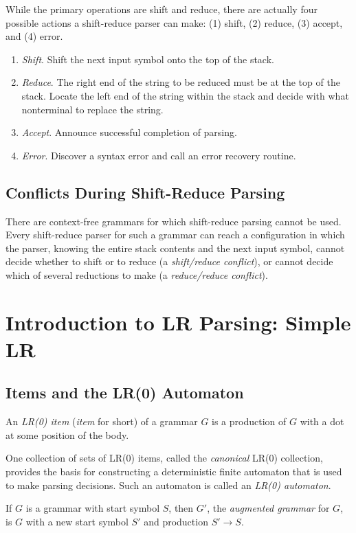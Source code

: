 \documentclass[12pt,a4paper,twoside,openany]{book}
\begin{document}
While the primary operations are shift and reduce, there are actually four possible actions a shift-reduce parser can make: (1) shift, (2) reduce, (3) accept, and (4) error.
\begin{enumerate}
    \item \textit{Shift}. Shift the next input symbol onto the top of the stack.
    \item \textit{Reduce}. The right end of the string to be reduced must be at the top of the stack. Locate the left end of the string within the stack and decide with what nonterminal to replace the string.
    \item \textit{Accept}. Announce successful completion of parsing.
    \item \textit{Error}. Discover a syntax error and call an error recovery routine.
\end{enumerate}

\subsection{Conflicts During Shift-Reduce Parsing}

There are context-free grammars for which shift-reduce parsing cannot be used. Every shift-reduce parser for such a grammar can reach a configuration in which the parser, knowing the entire stack contents and the next input symbol, cannot decide whether to shift or to reduce (a \textit{shift/reduce conflict}), or cannot decide which of several reductions to make (a \textit{reduce/reduce conflict}).

\section{Introduction to LR Parsing: Simple LR}
\subsection{Items and the LR(0) Automaton}

An \textit{LR(0) item} (\textit{item} for short) of a grammar $G$ is a production of $G$ with a dot at some position of the body.

One collection of sets of LR(0) items, called the \textit{canonical} LR(0) collection, provides the basis for constructing a deterministic finite automaton that is used to make parsing decisions. Such an automaton is called an \textit{LR(0) automaton}.

If $G$ is a grammar with start symbol $S$, then $G'$, the \textit{augmented grammar} for $G$, is $G$ with a new start symbol $S'$ and production $S'\rightarrow S$.
\end{document}
